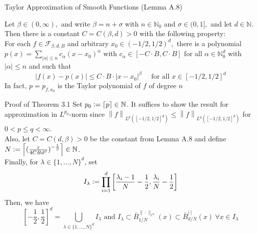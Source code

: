 \documentclass{if-beamer}
\newcommand{\defeq}{\vcentcolon=}
\newcommand{\norm}[2]{\left\lVert#1\right\rVert_{#2}}
\begin{document}
\begin{frame}{Taylor Approximation of Smooth Functions (Lemma A.8)}
    \begin{tcolorbox}
        Let $\beta \in(0, \infty),$ and write $\beta=n+\sigma$ with $n \in \mathbb{N}_{0}$ and $\sigma \in(0,1],$ and let $d \in \mathbb{N} .$ Then there is a constant $C=C(\beta, d)>0$ with the following property:\\
        For each $f \in \mathcal{F}_{\beta, d, B}$ and arbitrary $x_{0} \in(-1 / 2,1 / 2)^{d},$ there is a polynomial $p(x)=\sum_{|\alpha| \leq n} c_{\alpha}\left(x-x_{0}\right)^{\alpha}$ with $c_{\alpha} \in[-C \cdot B, C \cdot B]$ for all $\alpha \in \mathbb{N}_{0}^{d}$ with $|\alpha| \leq n$ and such that
        \[
        |f(x)-p(x)| \leq C \cdot B \cdot\left|x-x_{0}\right|^{\beta} \quad \text { for all } x \in[-1 / 2,1 / 2]^{d}
        \]
        In fact, $p=p_{f, x_{0}}$ is the Taylor polynomial of $f$ of degree $n$
    \end{tcolorbox}
    
\end{frame}



\begin{frame}{Proof of Theorem 3.1}
    Set $p_0 \defeq \left\lceil p \right\rceil \in \mathbb{N}$. It suffices to show the result for approximation in $L^{p_0}$-norm since $\norm{f}{L^p\left([-1/2, 1/2]^{d}\right)} \leq \norm{f}{L^q\left([-1/2, 1/2]^{d}\right)}$ for $0<p\leq q <\infty$.\\
    Also, let $C=C(d, \beta) > 0$ be the constant from Lemma A.8 and define $N \defeq \left\lceil (\frac{\varepsilon}{4CBd^{\beta}})^{-\frac{1}{\beta}} \right\rceil \in \mathbb{N}$.\\
    Finally, for $\lambda \in \{1,\dots,N\}^d$, set $$I_{\lambda} \defeq \prod_{i=1}^d \left[ \frac{\lambda_i - 1}{N} - \frac{1}{2}, \frac{\lambda_i}{N} - \frac{1}{2} \right] $$
    Then, we have $$\left[-\frac{1}{2}, \frac{1}{2} \right]^d = \bigcup_{\lambda \in \{1,\dots,N\}^d}I_{\lambda} \text{ and } I_{\lambda} \subset \bar{B}_{1 / N}^{\|\cdot\|_{\ell^{\infty}}}(x) \subset \bar{B}_{d / N}^{|\cdot|}(x) \ \forall x \in I_{\lambda}  $$
\end{frame}
\end{document}
